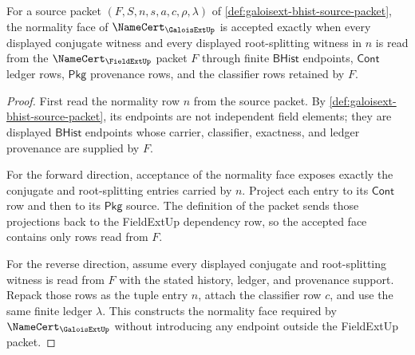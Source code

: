 \begin{theorem}
\label{thm:galoisext-normality-obligation-row}
For a source packet $(F,S,n,s,a,c,\rho,\lambda)$ of
\autoref{def:galoisext-bhist-source-packet}, the normality face of
$\NameCert_{\GaloisExtUp}$ is accepted exactly when every displayed conjugate
witness and every displayed root-splitting witness in $n$ is read from the
$\NameCert_{\FieldExtUp}$ packet $F$ through finite $\mathsf{BHist}$ endpoints,
$\mathsf{Cont}$ ledger rows, $\mathsf{Pkg}$ provenance rows, and the classifier
rows retained by $F$.
\end{theorem}
\begin{proof}
First read the normality row $n$ from the source packet. By
\autoref{def:galoisext-bhist-source-packet}, its endpoints are not independent
field elements; they are displayed $\mathsf{BHist}$ endpoints whose carrier,
classifier, exactness, and ledger provenance are supplied by $F$.

For the forward direction, acceptance of the normality face exposes exactly the
conjugate and root-splitting entries carried by $n$. Project each entry to its
$\mathsf{Cont}$ row and then to its $\mathsf{Pkg}$ source. The definition of
the packet sends those projections back to the FieldExtUp dependency row, so
the accepted face contains only rows read from $F$.

For the reverse direction, assume every displayed conjugate and root-splitting
witness is read from $F$ with the stated history, ledger, and provenance
support. Repack those rows as the tuple entry $n$, attach the classifier row
$c$, and use the same finite ledger $\lambda$. This constructs the normality
face required by $\NameCert_{\GaloisExtUp}$ without introducing any endpoint
outside the FieldExtUp packet.
\end{proof}

